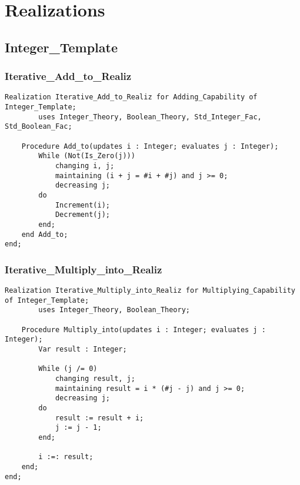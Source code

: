 

\section{Realizations\label{apx:real}}

	\subsection{Integer\_Template}	%

		\subsubsection{Iterative\_Add\_to\_Realiz}	%

\begin{lstlisting}[language=resolve]
Realization Iterative_Add_to_Realiz for Adding_Capability of Integer_Template;
		uses Integer_Theory, Boolean_Theory, Std_Integer_Fac, Std_Boolean_Fac;

	Procedure Add_to(updates i : Integer; evaluates j : Integer);
		While (Not(Is_Zero(j))) 
			changing i, j;
			maintaining (i + j = #i + #j) and j >= 0;
			decreasing j;
		do
			Increment(i);
			Decrement(j);
		end;
	end Add_to;
end;
\end{lstlisting}

		\subsubsection{Iterative\_Multiply\_into\_Realiz}	%

\begin{lstlisting}[language=resolve]
Realization Iterative_Multiply_into_Realiz for Multiplying_Capability of Integer_Template;
		uses Integer_Theory, Boolean_Theory;

	Procedure Multiply_into(updates i : Integer; evaluates j : Integer);
		Var result : Integer;

		While (j /= 0) 
			changing result, j;
			maintaining result = i * (#j - j) and j >= 0;
			decreasing j;
		do
			result := result + i;
			j := j - 1;
		end;

		i :=: result;
	end;
end;
\end{lstlisting}

